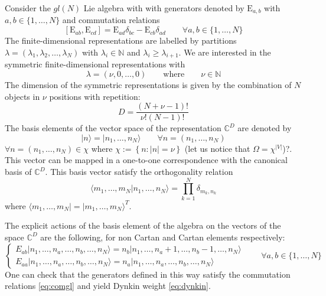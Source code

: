 \documentclass[11pt]{article}
\numberwithin{equation}{subsection}
\newcommand{\EE}{\mathrm{E}}
\newcommand{\twoj}{\nu}
\begin{document}
Consider the $gl(N)$ Lie algebra with with generators denoted by $\EE_{a,b}$ with $a,b\in \{1,\ldots,N\}$ and commutation relations
\begin{equation}\label{eq:comgl}
\left[\EE_{ab},\EE_{cd}\right]=\EE_{ad}\delta_{bc}-\EE_{cb}\delta_{ad}\qquad \forall a,b\in \{1,\ldots,N\}
\end{equation}
The finite-dimensional representations are labelled by partitions $\lambda=(\lambda_1,\lambda_2,\ldots,\lambda_N)$ with $\lambda_i\in \mathbb{N}$ and  $\lambda_i\geq \lambda_{i+1}$.
We are interested in the symmetric finite-dimensional representations with 
\begin{equation}\label{eq:dynkin}
    \lambda=(\twoj,0,\ldots,0) \qquad\text{where}\qquad \twoj\in\mathbb{N}
\end{equation} 
The dimension of the symmetric representations is given by the combination of $N$ objects in $\twoj$ positions with repetition:
\begin{equation}
	D= \frac{(N+\twoj-1)!}{\twoj  !(N-1)!}
\end{equation} 
The basis elements of the vector space of the representation $\mathbb{C}^{D}$ are denoted by 
\begin{equation}
  |n\rangle=  |n_{1},\ldots,n_{N}\rangle\qquad \forall
    n=(n_{1},\ldots,n_{N})
\end{equation}
$\forall n=(n_{1},\ldots,n_{N})\in \chi$ where $\chi:=\left\{n:|n|=\twoj\right\}$ {\color{red}(let us notice that $\Omega=\chi^{|V|}$)?}. This vector can be mapped in a one-to-one correspondence with the canonical basis of $\mathbb{C}^{D}$. This basis vector satisfy the orthogonality relation
\begin{equation}\label{ortho}
    \langle m_{1},\ldots,m_{N}|n_{1},\ldots,n_{N}\rangle=\prod_{k=1}^{N}\delta_{m_{k},n_{k}}
\end{equation}
where  $ \langle m_{1},\ldots,m_{N}|=| m_{1},\ldots,m_{N}\rangle^T$.
 
The explicit actions of the basis element of the algebra on the vectors of the space $\mathbb{C}^{D}$ are the following, for non Cartan and Cartan elements respectively: 
\begin{equation}\label{actionE}
	\begin{cases}
		E_{ab}|n_{1},\ldots,n_{a},\ldots,n_{b},\ldots,n_{N}\rangle =n_{b}|n_{1},\ldots,n_{a}+1,\ldots,n_{b}-1,\ldots,n_{N}\rangle\\[0.1cm]
		E_{aa}|n_{1},\ldots,n_{a},\ldots,n_{b},\ldots,n_{N}\rangle = n_{a} |n_{1},\ldots,n_{a},\ldots,n_{b},\ldots,n_{N}\rangle
	\end{cases}\qquad \forall a,b\in\{1,\ldots,N\}
\end{equation}  
One can check that the generators defined in this way satisfy the commutation relations \eqref{eq:comgl} and yield Dynkin weight \eqref{eq:dynkin}.
\end{document}
